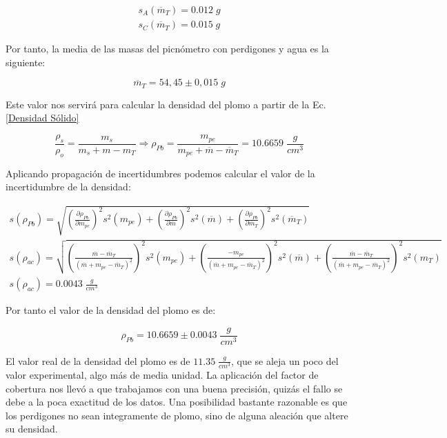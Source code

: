 \documentclass[a4paper,12pt,titlepage]{article}
\begin{document}
\begin{gather}
    s_{A}(\overline{m}_{T}) = 0.012 \; g \\
    s_{C}(\overline{m}_{T}) = 0.015 \; g
\end{gather}

\newpage

Por tanto, la media de las masas del picnómetro con perdigones y agua es la siguiente:

\begin{equation}
    \overline{m}_{T}=54,45 \pm 0,015 \; g
\end{equation}

Este valor nos servirá para calcular la densidad del plomo a partir de la Ec.\ref{Densidad Sólido}

\begin{equation}
    \frac{\rho_{s}}{\rho_{o}}=\frac{m_{s}}{m_{s}+m-m_{T}} \Rightarrow \rho_{Pb} = \frac{m_{pe}}{m_{pe}+\overline{m}-\overline{m}_{T}} = 10.6659\;  \frac{g}{cm^3}
\end{equation}

Aplicando propagación de incertidumbres podemos calcular el valor de la incertidumbre de la densidad:

\begin{gather}
    s(\rho_{Pb}) = \sqrt{\left (\frac{\partial \rho_{Pb}}{\partial m_{pe}} \right )^2 s^2(m_{pe})  +  \left (\frac{\partial \rho_{Pb}}{\partial \overline{m}} \right )^2 s^2(\overline{m})  +  \left (\frac{\partial \rho_{Pb}}{\partial \overline{m}_{T}} \right )^2 s^2(\overline{m}_{T})} \\ \textstyle
    s(\rho_{ac}) =
    \sqrt{\left (\frac{\overline{m}-\overline{m}_{T}}{(\overline{m}+m_{pe}-\overline{m}_{T})^2} \right )^2 s^2(m_{pe})  +  \left (\frac{-m_{pe}}{(\overline{m}+m_{pe}-\overline{m}_{T})^2} \right )^2 s^2(\overline{m})  +  \left (\frac{\overline{m}-\overline{m}_{T}}{(\overline{m}+m_{pe}-\overline{m}_{T})^2} \right )^2 s^2(m_{T})}\nonumber  \\
    s(\rho_{ac}) = 0.0043 \; \frac{g}{cm^3} \nonumber
\end{gather}

Por tanto el valor de la densidad del plomo es de:

\begin{equation}
    \rho_{Pb} = 10.6659 \pm 0.0043 \; \frac{g}{cm^3}
\end{equation}

El valor real de la densidad del plomo es de $11.35 \; \frac{g}{cm^3}$, que se aleja un poco del valor experimental, algo más de media unidad. La aplicación del factor de cobertura nos llevó a que trabajamos con una buena precisión, quizás el fallo se debe a la poca exactitud de los datos. Una posibilidad bastante razonable es que los perdigones no sean integramente de plomo, sino de alguna aleación que altere su densidad.
\end{document}
